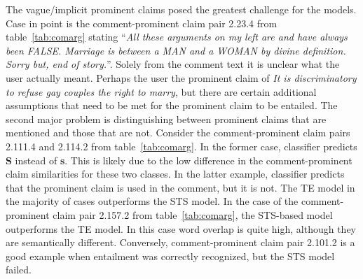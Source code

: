 The vague/implicit prominent claims posed the greatest challenge for the models. 
Case in point is the comment-prominent claim pair 2.23.4 from table~\ref{tab:comarg}  stating 
``\textit{All these arguments on my left are and have always been FALSE. Marriage is
between a MAN and a WOMAN by divine definition. Sorry but, end of story.}''.
Solely from the comment text it is unclear what the user actually meant. 
Perhaps the user  the prominent claim of 
\textit{ It is discriminatory to refuse gay couples the right to marry},
but there are certain additional assumptions that need to be met for the prominent claim 
to be entailed. 
The second major problem is distinguishing between prominent claims that are mentioned 
and those that are not. 
Consider the comment-prominent claim pairs 2.111.4 and 2.114.2 from table~\ref{tab:comarg}. 
In the former case, classifier predicts \textbf{S} instead of \textbf{s}. 
This is likely due to the low difference in the comment-prominent claim similarities for these
two classes. 
In the latter example, classifier predicts that the prominent claim is used in the comment, but
it is not. 
The TE model in the majority of cases outperforms the STS model. 
In the case of the comment-prominent claim pair 2.157.2 from table~\ref{tab:comarg}, the STS-based
model outperforms the TE model. 
In this case word overlap is quite high, although they are semantically different. 
Conversely, comment-prominent claim pair 2.101.2 is a good example when
entailment was correctly recognized, 
but the STS model failed. 


% 
